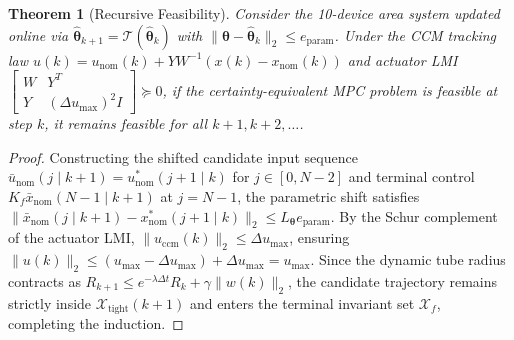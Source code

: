 \documentclass[journal]{IEEEtran}
\newtheorem{theorem}{Theorem}
\begin{document}
\begin{theorem}[Recursive Feasibility]
Consider the 10-device area system updated online via $\hat{\bm{\theta}}_{k+1} = \mathcal{T}(\hat{\bm{\theta}}_k)$ with $\|\bm{\theta} - \hat{\bm{\theta}}_k\|_2 \le e_{\text{param}}$. Under the CCM tracking law $u(k) = u_{\text{nom}}(k) + Y W^{-1}(x(k) - x_{\text{nom}}(k))$ and actuator LMI $\begin{bmatrix} W & Y^T \\ Y & (\Delta u_{\max})^2 I \end{bmatrix} \succeq 0$, if the certainty-equivalent MPC problem is feasible at step $k$, it remains feasible for all $k+1, k+2, \dots$.
\end{theorem}

\begin{proof}
Constructing the shifted candidate input sequence $\bar{u}_{\text{nom}}(j \mid k+1) = u_{\text{nom}}^*(j+1 \mid k)$ for $j \in [0, N-2]$ and terminal control $K_f \bar{x}_{\text{nom}}(N-1 \mid k+1)$ at $j = N-1$, the parametric shift satisfies $\|\bar{x}_{\text{nom}}(j \mid k+1) - x_{\text{nom}}^*(j+1 \mid k)\|_2 \le L_{\bm{\theta}} e_{\text{param}}$. By the Schur complement of the actuator LMI, $\|u_{\text{ccm}}(k)\|_2 \le \Delta u_{\max}$, ensuring $\|u(k)\|_2 \le (u_{\max} - \Delta u_{\max}) + \Delta u_{\max} = u_{\max}$. Since the dynamic tube radius contracts as $R_{k+1} \le e^{-\lambda \Delta t} R_k + \gamma \|w(k)\|_2$, the candidate trajectory remains strictly inside $\mathcal{X}_{\text{tight}}(k+1)$ and enters the terminal invariant set $\mathcal{X}_f$, completing the induction.
\end{proof}
\end{document}
